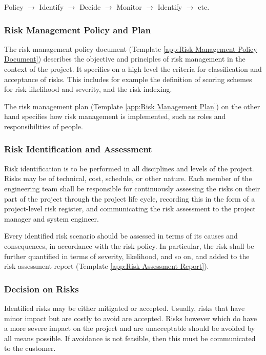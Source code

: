 Policy
$\rightarrow$ Identify
$\rightarrow$ Decide
$\rightarrow$ Monitor
$\rightarrow$ Identify
$\rightarrow$ etc.

\subsubsection{Risk Management Policy and Plan}

The risk management policy document (Template \ref{app:Risk Management Policy Document}) describes the objective and principles of risk management in the context of the project. It specifies on a high level the criteria for classification and acceptance of risks. This includes for example the definition of scoring schemes for risk likelihood and severity, and the risk indexing.

The risk management plan (Template \ref{app:Risk Management Plan}) on the other hand specifies how risk management is implemented, such as roles and responsibilities of people.

\subsubsection{Risk Identification and Assessment}

Risk identification is to be performed in all disciplines and levels of the project. Risks may be of technical, cost, schedule, or other nature. Each member of the engineering team shall be responsible for continuously assessing the risks on their part of the project through the project life cycle, recording this in the form of a project-level risk register, and communicating the risk assessment to the project manager and system engineer.

Every identified risk scenario should be assessed in terms of its causes and consequences, in accordance with the risk policy. In particular, the risk shall be further quantified in terms of severity, likelihood, and so on, and added to the risk assessment report (Template \ref{app:Risk Assessment Report}).

\subsubsection{Decision on Risks}
 
Identified risks may be either mitigated or accepted. Usually, risks that have minor impact but are costly to avoid are accepted. Risks however which do have a more severe impact on the project and are unacceptable should be avoided by all means possible. If avoidance is not feasible, then this must be communicated to the customer.

